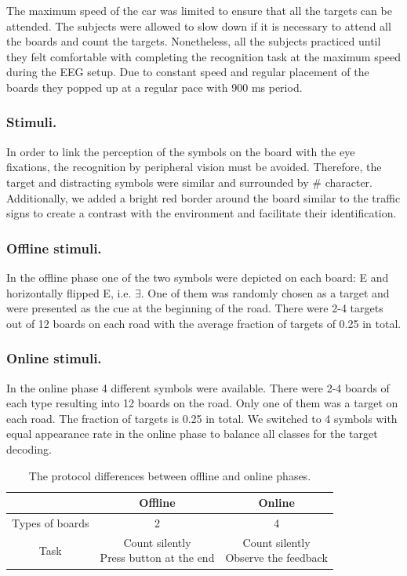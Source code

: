 \documentclass[12pt]{iopart}
\begin{document}
The maximum speed of the car was limited to ensure that all the targets
can be attended. The subjects were allowed to slow down if it is necessary
to attend all the boards and count the targets.
Nonetheless, all the subjects practiced until they felt comfortable 
with completing the recognition task at the maximum speed
during the EEG setup.
Due to constant speed and regular placement of the boards they
popped up at a regular pace with 900 ms period.

\subsubsection{Stimuli.} In order to link the perception of the symbols on the board
with the eye fixations, the recognition by
peripheral vision must be avoided. Therefore, the target and distracting
symbols were similar and surrounded by \# character.
Additionally, we added a bright red border around the board similar 
to the traffic signs
to create a contrast with the environment and facilitate
their identification.

\subsubsection*{Offline stimuli.}
In the offline phase one of the two symbols were depicted on each board:
E and horizontally flipped E, i.e. $\exists$.
One of them was randomly chosen as a target and were presented as the cue
at the beginning of the road. There were 2-4 targets out of 12 boards
on each road with the average fraction of targets of 0.25 in total.

\subsubsection*{Online stimuli.}
In the online phase 4 different symbols were available. There were
2-4 boards of each type resulting into 12 boards on the road.
Only one of them was a target on each road. The fraction
of targets is 0.25 in total.
We switched to 4 symbols with equal appearance rate in the online phase
to balance all classes for the target decoding.


\begin{table}
    \centering
    \caption{The protocol differences between offline and online phases.}
    \begin{tabular}{c | c | c}
        \hline 
        & Offline & Online \\
        \hline 
        Types of boards & 2 & 4 \\
        Task & \shortstack{Count silently \\ Press button at the end} & \shortstack{Count silently \\ Observe the feedback} \\
        \hline 
    \end{tabular}
    \label{tab:OffOn}
\end{table}
\end{document}
